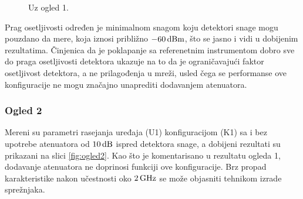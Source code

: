 \documentclass[a4paper, 12pt, diplomski]{etf}
\newcommand{\unit}[1]{\,{\rm #1}}
\begin{document}
\begin{figure}[ht!]
\begin{subfigure}[b]{0.49\textwidth}
        \label{fig:s21_bpf}
    \end{subfigure}
    \caption{Uz ogled 1.}
    \label{fig:ogled1}
\end{figure}
%
Prag osetljivosti određen je minimalnom snagom
koju detektori snage mogu pouzdano da mere, koja
iznosi približno $-60\unit{dBm}$, što se 
jasno i vidi u dobijenim rezultatima. Činjenica da 
je poklapanje sa referenetnim instrumentom dobro
sve do praga osetljivosti detektora ukazuje na
to da je ograničavajući faktor osetljivost 
detektora, a ne prilagođenja u mreži, usled čega 
se performanse ove konfiguracije ne mogu značajno
unaprediti dodavanjem atenuatora.

\subsubsection{Ogled 2}
Mereni su parametri rasejanja uređaja (U1) 
konfiguracijom (K1) sa i bez upotrebe atenuatora  
od $10\unit{dB}$
ispred detektora snage, a
dobijeni rezultati su
prikazani na slici \ref{fig:ogled2}. Kao
što je komentarisano u rezultatu ogleda 1, 
dodavanje atenuatora ne doprinosi funkciji 
ove konfiguracije. 
Brz propad karakteristike nakon učestnosti oko 
$2\unit{GHz}$ se može objasniti tehnikom 
izrade sprežnjaka.
\end{document}
